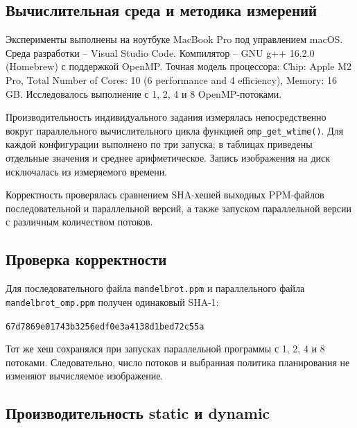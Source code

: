 \documentclass[12pt,a4paper]{article}
\begin{document}
\subsection{Вычислительная среда и методика измерений}

Эксперименты выполнены на ноутбуке MacBook Pro под управлением macOS. Среда разработки -- Visual Studio Code. Компилятор -- GNU g++ 16.2.0 (Homebrew) с поддержкой OpenMP. Точная модель процессора: Chip: Apple M2 Pro, Total Number of Cores: 10 (6 performance and 4 efficiency), Memory: 16 GB. Исследовалось выполнение с 1, 2, 4 и 8 OpenMP-потоками.

Производительность индивидуального задания измерялась непосредственно вокруг параллельного вычислительного цикла функцией \texttt{omp\_get\_wtime()}. Для каждой конфигурации выполнено по три запуска; в таблицах приведены отдельные значения и среднее арифметическое. Запись изображения на диск исключалась из измеряемого времени.

Корректность проверялась сравнением SHA-хешей выходных PPM-файлов последовательной и параллельной версий, а также запуском параллельной версии с различным количеством потоков.

\subsection{Проверка корректности}

Для последовательного файла \texttt{mandelbrot.ppm} и параллельного файла \texttt{mandelbrot\_omp.ppm} получен одинаковый SHA-1:

\begin{center}
\texttt{67d7869e01743b3256edf0e3a4138d1bed72c55a}
\end{center}

Тот же хеш сохранялся при запусках параллельной программы с 1, 2, 4 и 8 потоками. Следовательно, число потоков и выбранная политика планирования не изменяют вычисляемое изображение.

\subsection{Производительность static и dynamic}
\end{document}
